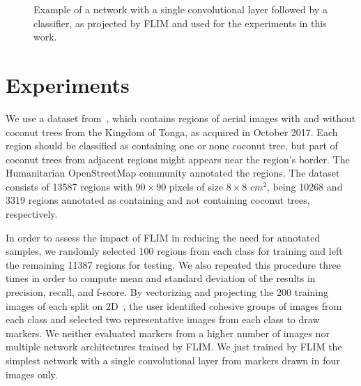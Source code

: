 \documentclass[a4paper,conference]{IEEEtran}
\begin{document}
\begin{figure}
  \begin{center}

  \end{center}
  \caption{Example of a network with a single convolutional layer followed by a classifier, as projected by FLIM and used for the experiments in this work.}
  \label{fig:tree}
\end{figure}

\section{Experiments}

We use a dataset from~\cite{8899005}, which contains regions of aerial images with and without coconut trees from the Kingdom of Tonga, as acquired in October 2017. Each region should be classified as containing one or none coconut tree, but part of coconut trees from adjacent regions might appears near the region's border. The Humanitarian OpenStreetMap community annotated the regions. The dataset consists of 13587 regions with $90 \times 90$ pixels of size $8\times 8$  $cm^2$, being 10268 and 3319 regions annotated as containing and not containing coconut trees, respectively.

In order to assess the impact of FLIM in reducing the need for annotated samples, we randomly selected 100 regions from each class for training and left the remaining 11387 regions for testing. We also repeated this procedure three times in order to compute mean and standard deviation of the results in precision, recall, and f-score. By vectorizing and projecting the 200 training images of each split on 2D~\cite{maaten2008visualizing}, the user identified cohesive groups of images from each class and selected two representative images from each class to draw markers. We neither evaluated markers from a higher number of images nor multiple network architectures trained by FLIM. We just trained by FLIM the simplest network with a single convolutional layer from markers drawn in four images only.
\end{document}
